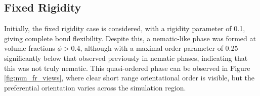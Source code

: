 \documentclass[11pt, a4paper]{article} %
\begin{document}
\subsection{Fixed Rigidity}

Initially, the fixed rigidity case is considered, with a rigidity parameter of \num{0.1}, giving complete bond flexibility. Despite this, a nematic-like phase was formed at volume fractions $\phi > 0.4$, although with a maximal order parameter of \num{0.25} significantly below that observed previously in nematic phases, indicating that this was not truly nematic. This quasi-ordered phase can be observed in Figure \ref{fig:nun_fr_views}, where clear short range orientational order is visible, but the preferential orientation varies across the simulation region.
\end{document}
